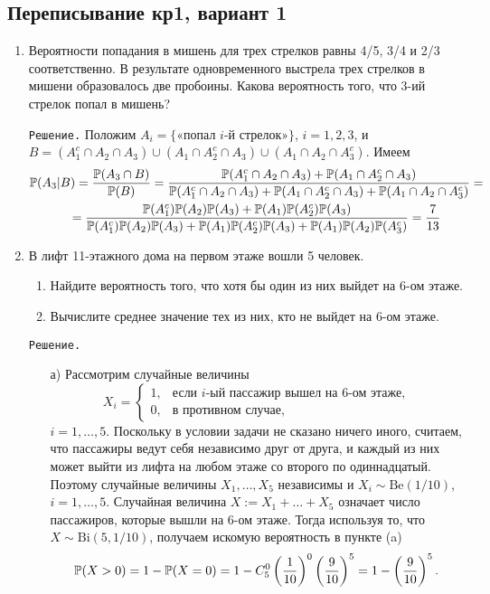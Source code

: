 \subsection{Переписывание кр1, вариант 1}
\begin{enumerate}
\item %
Вероятности попадания в мишень для трех стрелков равны 4/5, 3/4 и 2/3 соответственно. В результате одновременного выстрела трех стрелков в мишени образовалось две пробоины. Какова вероятность того, что 3-ий стрелок попал в мишень?

\verb"Решение." Положим $A_i = \{\text{«попал $i$-й стрелок»}\}$, $i = 1,2,3$, и $B = (A_1^c \cap A_2 \cap A_3) \cup (A_1 \cap A_2^c \cap A_3) \cup (A_1 \cap A_2 \cap A_3^c)$. Имеем
\begin{multline*}
\P(A_3|B) = \frac{\P(A_3 \cap B)}{\P(B)} = \frac{\P(A_1^c \cap A_2 \cap A_3) + \P(A_1 \cap A_2^c \cap A_3)}{\P(A_1^c \cap A_2 \cap A_3) + \P(A_1 \cap A_2^c \cap A_3) + \P(A_1 \cap A_2 \cap A_3^c)} = \\
= \frac{\P(A_1^c)\P(A_2)\P(A_3) + \P(A_1)\P(A_2^c)\P(A_3)}{\P(A_1^c)\P(A_2)\P(A_3) + \P(A_1)\P(A_2^c)\P(A_3) + \P(A_1)\P(A_2)\P(A_3^c)} = \frac{7}{13}
\end{multline*}
\item В лифт 11-этажного дома на первом этаже вошли 5 человек.
\begin{enumerate}
\item Найдите вероятность того, что хотя бы один из них выйдет на 6-ом этаже.
\item Вычислите среднее значение тех из них, кто не выйдет на 6-ом этаже.
\end{enumerate}

\verb"Решение."
\begin{enumerate}
\item[а)] Рассмотрим случайные величины
\[
X_i =
                  \begin{cases}
                     1,     &   \text{если $i$-ый пассажир вышел на 6-ом этаже,} \\
                     0,     &   \text{в противном случае,}
                  \end{cases}
\]
$i = 1,\ldots,5$. Поскольку в условии задачи не сказано ничего иного, считаем, что пассажиры ведут себя независимо друг от друга, и каждый из них может выйти из лифта на любом этаже со второго по одиннадцатый. Поэтому случайные величины $X_1, \dots, X_5$ независимы и $X_i \sim \mathrm{Be}(1/10)$, $i = 1,\ldots,5$.
Случайная величина $X:=X_1+\ldots+X_5$ означает число пассажиров, которые вышли на 6-ом этаже. Тогда используя то, что $X \sim \mathrm{Bi}(5,1/10)$, получаем искомую вероятность в пункте (a)
\[
\P(X>0) = 1 - \P(X=0) = 1 - C_{5}^{0}\left(\frac{1}{10}\right)^{0}\left(\frac{9}{10}\right)^{5} = 1 - \left(\frac{9}{10}\right)^{5} \text{.}
\]


\end{enumerate}
\end{enumerate}

